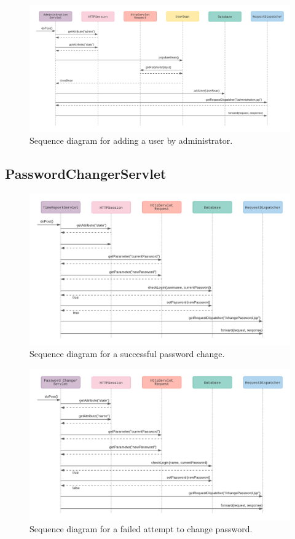 \documentclass{article}
\begin{document}
\begin{figure}[H]
    \centering
    \includegraphics[scale=0.6]{images/addUser.png}
    \caption{Sequence diagram for adding a user by administrator.}
    \label{fig:failedLoginAttempt}
\end{figure}

\pagebreak
\subsection{PasswordChangerServlet}

\begin{figure}[h]
    \centering
    \includegraphics[scale=0.6]{images/successfulPasswordChange.png}
    \caption{Sequence diagram for a successful password change.}
    \label{fig:sucessfulPasswordChange}
\end{figure}

\begin{figure}[H]
    \centering
    \includegraphics[scale=0.6]{images/unsuccessfulPasswordChange.png}
    \caption{Sequence diagram for a failed attempt to change password.}
    \label{fig:failedPasswordChange}
\end{figure}
\end{document}
